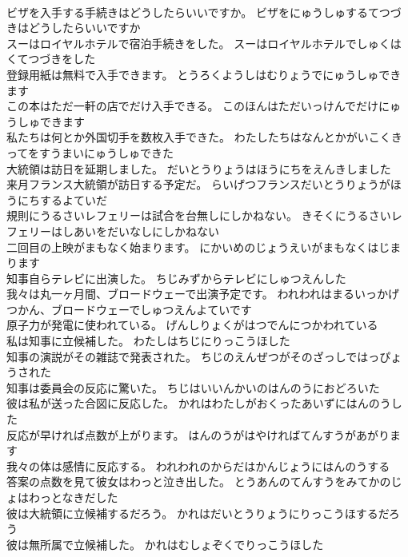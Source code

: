 \documentclass[8pt]{extreport}
\begin{document}
\begin{CJK}{UTF8}{min}
\\	ビザを入手する手続きはどうしたらいいですか。	ビザをにゅうしゅするてつづきはどうしたらいいですか 
\\	スーはロイヤルホテルで宿泊手続きをした。	スーはロイヤルホテルでしゅくはくてつづきをした 
\\	登録用紙は無料で入手できます。	とうろくようしはむりょうでにゅうしゅできます 
\\	この本はただ一軒の店でだけ入手できる。	このほんはただいっけんでだけにゅうしゅできます 
\\	私たちは何とか外国切手を数枚入手できた。	わたしたちはなんとかがいこくきってをすうまいにゅうしゅできた 
\\	大統領は訪日を延期しました。	だいとうりょうはほうにちをえんきしました 
\\	来月フランス大統領が訪日する予定だ。	らいげつフランスだいとうりょうがほうにちするよていだ 
\\	規則にうるさいレフェリーは試合を台無しにしかねない。	きそくにうるさいレフェリーはしあいをだいなしにしかねない 
\\	二回目の上映がまもなく始まります。	にかいめのじょうえいがまもなくはじまります 
\\	知事自らテレビに出演した。	ちじみずからテレビにしゅつえんした 
\\	我々は丸一ヶ月間、ブロードウェーで出演予定です。	われわれはまるいっかげつかん、ブロードウェーでしゅつえんよていです 
\\	原子力が発電に使われている。	げんしりょくがはつでんにつかわれている 
\\	私は知事に立候補した。	わたしはちじにりっこうほした 
\\	知事の演説がその雑誌で発表された。	ちじのえんぜつがそのざっしではっぴょうされた 
\\	知事は委員会の反応に驚いた。	ちじはいいんかいのはんのうにおどろいた 
\\	彼は私が送った合図に反応した。	かれはわたしがおくったあいずにはんのうした 
\\	反応が早ければ点数が上がります。	はんのうがはやければてんすうがあがります 
\\	我々の体は感情に反応する。	われわれのからだはかんじょうにはんのうする 
\\	答案の点数を見て彼女はわっと泣き出した。	とうあんのてんすうをみてかのじょはわっとなきだした 
\\	彼は大統領に立候補するだろう。	かれはだいとうりょうにりっこうほするだろう 
\\	彼は無所属で立候補した。	かれはむしょぞくでりっこうほした 

\end{CJK}
\end{document}
